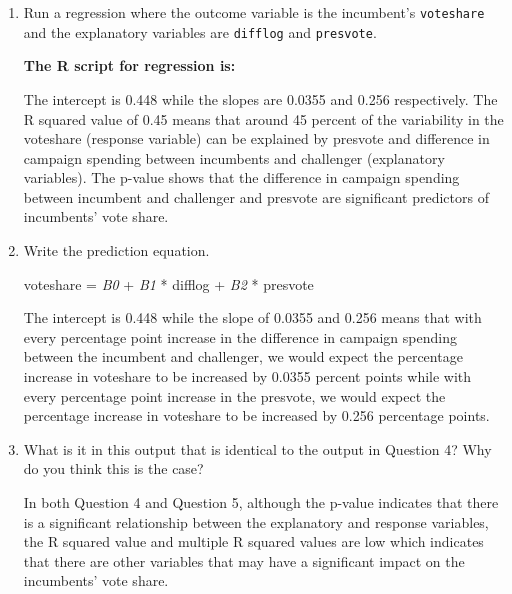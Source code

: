 \documentclass[12pt,letterpaper]{article}
\begin{document}
	\begin{enumerate}
		\item Run a regression where the outcome variable is the incumbent's \texttt{voteshare} and the explanatory variables are \texttt{difflog} and \texttt{presvote}.
	
	
		\textbf{		The R script for regression is:}
		 
	
	
		The intercept is 0.448 while the slopes are 0.0355 and 0.256 respectively. The R squared value of 0.45 means that around 45 percent of the variability in the voteshare (response variable) can be explained by presvote and difference in campaign spending between incumbents and challenger (explanatory variables). The p-value shows that the difference in campaign spending between incumbent and challenger and presvote are significant predictors of incumbents' vote share.
	
		\item Write the prediction equation.
	
	
		voteshare = \textit{B0} + \textit{B1} * difflog + \textit{B2} * presvote
	
		The intercept is 0.448 while the slope of 0.0355 and 0.256 means that with every percentage point increase in the difference in campaign spending between the incumbent and challenger, we would expect the percentage increase in voteshare to be increased by 0.0355 percent points while with every percentage point increase in the presvote, we would expect the percentage increase in voteshare to be increased by 0.256 percentage points.
	
	
		\item What is it in this output that is identical to the output in Question 4? Why do you think this is the case?
	
		In both Question 4 and Question 5, although the p-value indicates that there is a significant relationship between the explanatory and response variables, the R squared value and multiple R squared values are low which indicates that there are other variables that may have a significant impact on the incumbents' vote share.   
	
	\end{enumerate}
\end{document}
